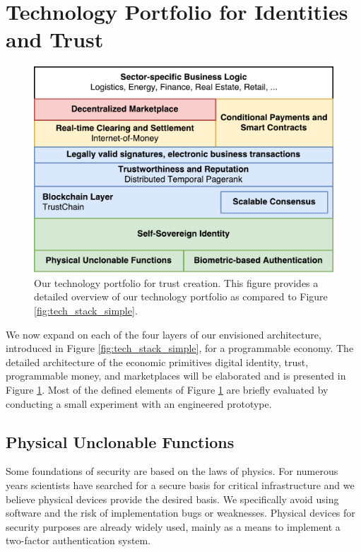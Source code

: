 \documentclass[USenglish]{article}
\begin{document}
\section{Technology Portfolio for Identities and Trust}

\begin{figure}[t]
	\centering
	\includegraphics[width=1\columnwidth]{assets/tech_stack}
	\caption{Our technology portfolio for trust creation. This figure provides a detailed overview of our technology portfolio as compared to Figure \ref{fig:tech_stack_simple}.}
	\label{fig:tech_stack}
\end{figure}

We now expand on each of the four layers of our envisioned architecture, introduced in Figure \ref{fig:tech_stack_simple}, for a programmable economy.
The detailed architecture of the economic primitives digital identity, trust, programmable money, and marketplaces will be elaborated and is presented in Figure \ref{fig:tech_stack}.
Most of the defined elements of Figure \ref{fig:tech_stack} are briefly evaluated by conducting a small experiment with an engineered prototype.

\subsection{Physical Unclonable Functions}
\label{sec:pufs}
Some foundations of security are based on the laws of physics.
For numerous years scientists have searched for a secure basis for critical infrastructure and we believe physical devices provide the desired basis.
We specifically avoid using software and the risk of implementation bugs or weaknesses.
Physical devices for security purposes are already widely used, mainly as a means to implement a two-factor authentication system.
\end{document}

